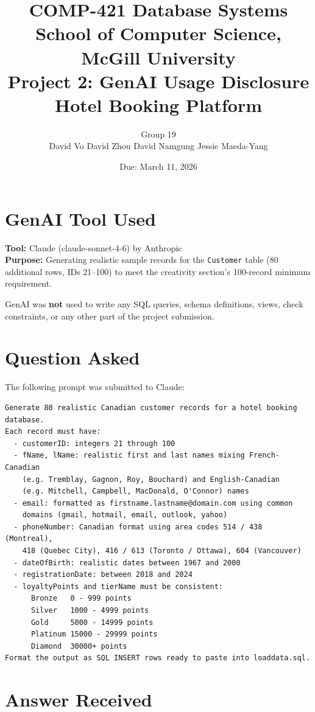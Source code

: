 \documentclass[12pt,letterpaper]{article}
\title{
    \vspace{-1cm}
    \textbf{COMP-421 Database Systems}\\[0.3em]
    \large School of Computer Science, McGill University\\[0.5em]
    \LARGE\textbf{Project 2: GenAI Usage Disclosure}\\[0.3em]
    \large Hotel Booking Platform
}
\author{
    Group 19\\
    David Vo \quad David Zhou \quad David Namgung \quad Jessie Maeda-Yang
}
\date{Due: March 11, 2026}
\begin{document}
\maketitle

\section*{GenAI Tool Used}

\textbf{Tool:} Claude (claude-sonnet-4-6) by Anthropic\\
\textbf{Purpose:} Generating realistic sample records for the \texttt{Customer} table (80 additional rows, IDs 21--100) to meet the creativity section's 100-record minimum requirement.

\bigskip
\noindent GenAI was \textbf{not} used to write any SQL queries, schema definitions, views, check constraints, or any other part of the project submission.

\section*{Question Asked}

The following prompt was submitted to Claude:

\begin{lstlisting}[style=plaintext]
Generate 80 realistic Canadian customer records for a hotel booking database.
Each record must have:
  - customerID: integers 21 through 100
  - fName, lName: realistic first and last names mixing French-Canadian
    (e.g. Tremblay, Gagnon, Roy, Bouchard) and English-Canadian
    (e.g. Mitchell, Campbell, MacDonald, O'Connor) names
  - email: formatted as firstname.lastname@domain.com using common
    domains (gmail, hotmail, email, outlook, yahoo)
  - phoneNumber: Canadian format using area codes 514 / 438 (Montreal),
    418 (Quebec City), 416 / 613 (Toronto / Ottawa), 604 (Vancouver)
  - dateOfBirth: realistic dates between 1967 and 2000
  - registrationDate: between 2018 and 2024
  - loyaltyPoints and tierName must be consistent:
      Bronze   0 - 999 points
      Silver   1000 - 4999 points
      Gold     5000 - 14999 points
      Platinum 15000 - 29999 points
      Diamond  30000+ points
Format the output as SQL INSERT rows ready to paste into loaddata.sql.
\end{lstlisting}

\section*{Answer Received}
\end{document}
